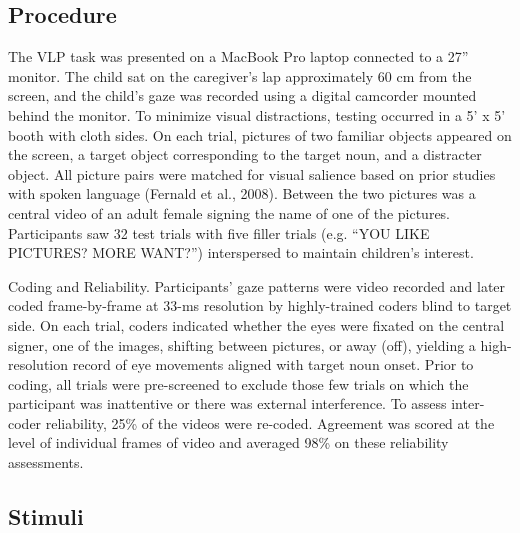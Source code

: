 \documentclass[oneside]{report}
\begin{document}
\subsection{Procedure}\label{procedure}

The VLP task was presented on a MacBook Pro laptop connected to a 27''
monitor. The child sat on the caregiver's lap approximately 60 cm from
the screen, and the child's gaze was recorded using a digital camcorder
mounted behind the monitor. To minimize visual distractions, testing
occurred in a 5' x 5' booth with cloth sides. On each trial, pictures of
two familiar objects appeared on the screen, a target object
corresponding to the target noun, and a distracter object. All picture
pairs were matched for visual salience based on prior studies with
spoken language (Fernald et al., 2008). Between the two pictures was a
central video of an adult female signing the name of one of the
pictures. Participants saw 32 test trials with five filler trials (e.g.
``YOU LIKE PICTURES? MORE WANT?'') interspersed to maintain children's
interest.

Coding and Reliability. Participants' gaze patterns were video recorded
and later coded frame-by-frame at 33-ms resolution by highly-trained
coders blind to target side. On each trial, coders indicated whether the
eyes were fixated on the central signer, one of the images, shifting
between pictures, or away (off), yielding a high-resolution record of
eye movements aligned with target noun onset. Prior to coding, all
trials were pre-screened to exclude those few trials on which the
participant was inattentive or there was external interference. To
assess inter-coder reliability, 25\% of the videos were re-coded.
Agreement was scored at the level of individual frames of video and
averaged 98\% on these reliability assessments.

\subsection{Stimuli}\label{stimuli}
\end{document}
